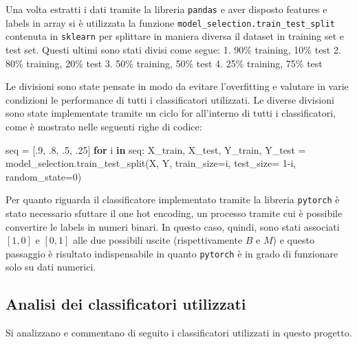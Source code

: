 \documentclass[11pt]{article}
\newenvironment{Shaded}{}{}
\newcommand{\KeywordTok}[1]{\textcolor[rgb]{0.00,0.44,0.13}{\textbf{{#1}}}}
\newcommand{\DecValTok}[1]{\textcolor[rgb]{0.25,0.63,0.44}{{#1}}}
\newcommand{\NormalTok}[1]{{#1}}
\newcommand{\ControlFlowTok}[1]{\textcolor[rgb]{0.00,0.44,0.13}{\textbf{{#1}}}}
\newcommand{\OperatorTok}[1]{\textcolor[rgb]{0.40,0.40,0.40}{{#1}}}
\begin{document}
Una volta estratti i dati tramite la libreria \texttt{pandas} e aver
disposto features e labels in array si è utilizzata la funzione
\texttt{model\_selection.train\_test\_split} contenuta in
\texttt{sklearn} per splittare in maniera diversa il dataset in training
set e test set. Questi ultimi sono stati divisi come segue: 1. 90\%
training, 10\% test 2. 80\% training, 20\% test 3. 50\% training, 50\%
test 4. 25\% training, 75\% test

Le divisioni sono state pensate in modo da evitare l'overfitting e
valutare in varie condizioni le performance di tutti i classificatori
utilizzati. Le diverse divisioni sono state implementate tramite un
ciclo for all'interno di tutti i classificatori, come è mostrato nelle
seguenti righe di codice:

\begin{Shaded}
\begin{Highlighting}[]
\NormalTok{seq }\OperatorTok{=}\NormalTok{ [.}\DecValTok{9}\NormalTok{, .}\DecValTok{8}\NormalTok{, .}\DecValTok{5}\NormalTok{, .}\DecValTok{25}\NormalTok{]}
\ControlFlowTok{for}\NormalTok{ i }\KeywordTok{in}\NormalTok{ seq:}
\NormalTok{    X_train, X_test, Y_train, Y_test }\OperatorTok{=}\NormalTok{ model_selection.train_test_split(X, Y, train_size}\OperatorTok{=}\NormalTok{i, test_size}\OperatorTok{=} \DecValTok{1}\OperatorTok{-}\NormalTok{i, }
\NormalTok{                                                                        random_state}\OperatorTok{=}\DecValTok{0}\NormalTok{)}
\end{Highlighting}
\end{Shaded}

Per quanto riguarda il classificatore implementato tramite la libreria
\texttt{pytorch} è stato necessario sfuttare il one hot encoding, un
processo tramite cui è possibile convertire le labels in numeri binari.
In questo caso, quindi, sono stati associati \([1,0]\) e \([0,1]\) alle
due possibili uscite (rispettivamente \(B\) e \(M\)) e questo passaggio
è risultato indispensabile in quanto \texttt{pytorch} è in grado di
funzionare solo su dati numerici.

    \subsection{Analisi dei classificatori
utilizzati}\label{analisi-dei-classificatori-utilizzati}

    Si analizzano e commentano di seguito i classificatori utilizzati in
questo progetto.
\end{document}
